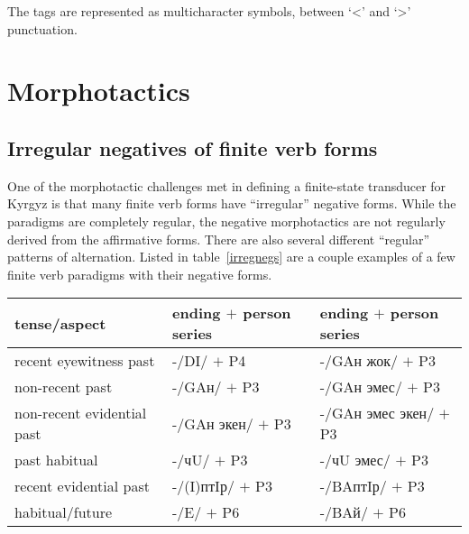 \documentclass[10pt,a4paper,twocolumn]{article}
\begin{document}
The tags are represented as multicharacter symbols, between `<' and `>' punctuation.


\section{Morphotactics}


\subsection{Irregular negatives of finite verb forms}

One of the morphotactic challenges met in defining a finite-state transducer for Kyrgyz is that many finite verb forms have ``irregular'' negative forms.  While the paradigms are completely regular, the negative morphotactics are not regularly derived from the affirmative forms.  There are also several different ``regular'' patterns of alternation.  Listed in table~\ref{irregnegs} are a couple examples of a few finite verb paradigms with their negative forms.

\begin{table*}[htbp]
	\caption{examples of different affirmative / negative alternations in finite verb forms}\label{irregnegs}
	\centering
	\begin{tabular}{lll}
		\toprule
		tense/aspect & ending $+$ person series & ending $+$ person series \\
		\midrule
		recent eyewitness past & -/DI/ $+$ P4\footnotemark{} & -/GAн жок/ $+$ P3\\
		non-recent past & -/GAн/ $+$ P3 & -/GAн эмес/ $+$ P3\\
		non-recent evidential past & -/GAн экен/ $+$ P3 & -/GAн эмес экен/ $+$ P3\\
		past habitual & -/чU/ $+$ P3 & -/чU эмес/ $+$ P3\\
		recent evidential past & -/(I)птIр/ $+$ P3 & -/BAптIр/ $+$ P3\\
		habitual/future & -/E/ $+$ P6 & -/BAй/ $+$ P6\\
		\bottomrule
	\end{tabular}
\end{table*}
\end{document}
